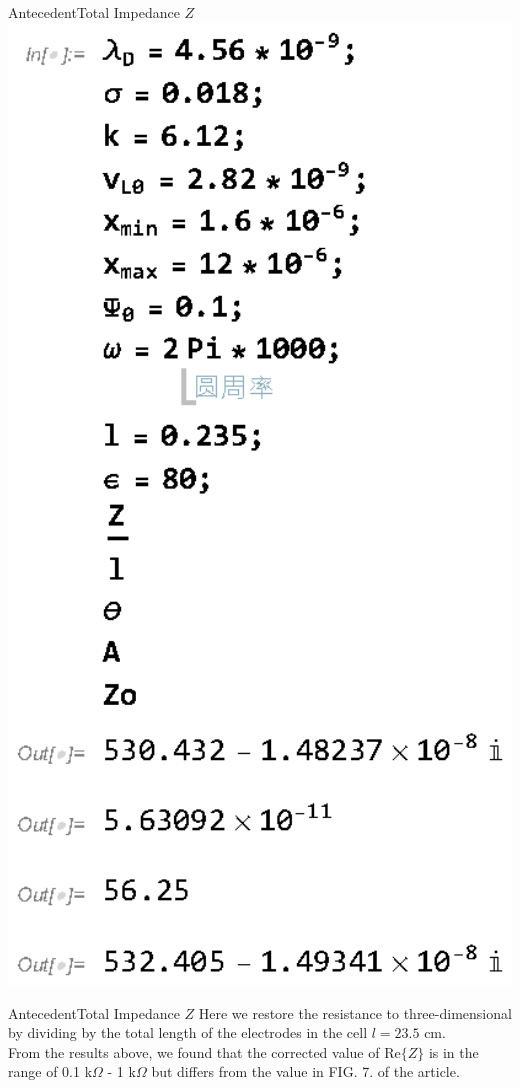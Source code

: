 \documentclass[11pt]{beamer}
\begin{document}
\begin{frame}{Antecedent}{Total Impedance $Z$}
    \includegraphics[width=1\textwidth]{2.eps}
\end{frame}
\begin{frame}{Antecedent}{Total Impedance $Z$}
    Here we restore the resistance to three-dimensional by dividing by the total length of the electrodes in the cell $l=23.5$ cm.\\
    From the results above, we found that the corrected value of $\mathrm{Re}\{Z\}$ is in the range of 0.1 k$\Omega$ - 1 k$\Omega$ but differs from the value in FIG. 7. of the article.
\end{frame}
\end{document}
